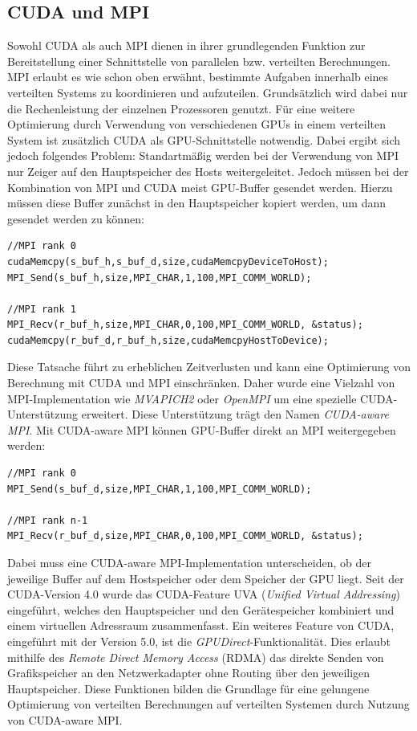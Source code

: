 \documentclass[doktyp=semarbeit, sprache=german]{TUBAFarbeiten}
\begin{document}
\subsection{CUDA und MPI}
Sowohl CUDA als auch MPI dienen in ihrer grundlegenden Funktion zur Bereitstellung einer Schnittstelle von parallelen bzw. verteilten Berechnungen. MPI erlaubt es wie schon oben erwähnt, bestimmte Aufgaben innerhalb eines verteilten Systems zu koordinieren und aufzuteilen. Grundsätzlich wird dabei nur die Rechenleistung der einzelnen Prozessoren genutzt. 
Für eine weitere Optimierung durch Verwendung von verschiedenen GPUs in einem verteilten System ist zusätzlich CUDA als GPU-Schnittstelle notwendig.
Dabei ergibt sich jedoch folgendes Problem: Standartmäßig werden bei der Verwendung von MPI nur Zeiger auf den Hauptspeicher des Hosts weitergeleitet. Jedoch müssen bei der Kombination von MPI und CUDA meist GPU-Buffer gesendet werden. Hierzu müssen diese Buffer zunächst in den Hauptspeicher kopiert werden, um dann gesendet werden zu können:
\begin{lstlisting}
//MPI rank 0
cudaMemcpy(s_buf_h,s_buf_d,size,cudaMemcpyDeviceToHost);
MPI_Send(s_buf_h,size,MPI_CHAR,1,100,MPI_COMM_WORLD);

//MPI rank 1
MPI_Recv(r_buf_h,size,MPI_CHAR,0,100,MPI_COMM_WORLD, &status);
cudaMemcpy(r_buf_d,r_buf_h,size,cudaMemcpyHostToDevice);
\end{lstlisting}
Diese Tatsache führt zu erheblichen Zeitverlusten und kann eine Optimierung von Berechnung mit CUDA und MPI einschränken. Daher wurde eine Vielzahl von MPI-Implementation wie \textit{MVAPICH2} oder \textit{OpenMPI} um eine spezielle CUDA-Unterstützung erweitert. Diese Unterstützung trägt den Namen \textit{CUDA-aware MPI}. Mit CUDA-aware MPI können GPU-Buffer direkt an MPI weitergegeben werden:
\begin{lstlisting}
//MPI rank 0
MPI_Send(s_buf_d,size,MPI_CHAR,1,100,MPI_COMM_WORLD);

//MPI rank n-1
MPI_Recv(r_buf_d,size,MPI_CHAR,0,100,MPI_COMM_WORLD, &status);
\end{lstlisting}
Dabei muss eine CUDA-aware MPI-Implementation unterscheiden, ob der jeweilige Buffer auf dem Hostspeicher oder dem Speicher der GPU liegt. Seit der CUDA-Version 4.0 wurde das CUDA-Feature UVA (\textit{Unified Virtual Addressing}) eingeführt, welches den Hauptspeicher und den Gerätespeicher kombiniert und einem virtuellen Adressraum zusammenfasst.
Ein weiteres Feature von CUDA, eingeführt mit der Version 5.0, ist die \textit{GPUDirect}-Funktionalität. Dies erlaubt mithilfe des \textit{Remote Direct Memory Access} (RDMA) das direkte Senden von Grafikspeicher an den Netzwerkadapter ohne Routing über den jeweiligen Hauptspeicher. 
Diese Funktionen bilden die Grundlage für eine gelungene Optimierung von verteilten Berechnungen auf verteilten Systemen durch Nutzung von CUDA-aware MPI.
\end{document}
